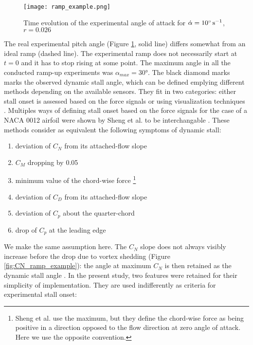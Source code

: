 \begin{figure}[h]
	\centering
	\texttt{[image: ramp\_example.png]}
	\caption{Time evolution of the experimental angle of attack for $\dot{\alpha}=10\si{\degree \per \second}$, $r=0.026$}
	\label{fig:ramp_example}
\end{figure}

The real experimental pitch angle (Figure \ref{fig:ramp_example}, solid line) differs somewhat from an ideal ramp (dashed line). The experimental ramp does not necessarily start at $t=0$ and it has to stop rising at some point. The maximum angle in all the conducted ramp-up experiments was $\alpha_{max}=\ang{30}$. The black diamond marks marks the observed dynamic stall angle, which can be defined emplying different methods depending on the available sensors.  They fit in two categories: either stall onset is assessed based on the force signals \cite{sheng_new_2006} or using visualization techniques \cite{mulleners_coherent_2010}.
Multiples ways of defining stall onset based on the force signals for the case of a NACA 0012 airfoil were shown by Sheng et al. \cite{sheng_new_2006} to be interchangable . These methods consider as equivalent the following symptoms of dynamic stall: 

\begin{enumerate}
	\item deviation of $C_N$ from its attached-flow slope
	\item $C_M$ dropping by 0.05 
	\item minimum value of the chord-wise force \footnote{Sheng et al. use the maximum, but they define the chord-wise force as being positive in a direction opposed to the flow direction at zero angle of attack. Here we use the opposite convention.}
	\item deviation of $C_D$ from its attached-flow slope
	\item deviation of $C_p$ about the quarter-chord
	\item drop of $C_p$ at the leading edge
\end{enumerate}

We make the same assumption here. The $C_N$ slope does not always visibly increase before the drop due to vortex shedding (Figure \ref{fig:CN_ramp_example}): the angle at maximum $C_N$ is then retained as the dynamic stall angle \cite{mulleners_dynamic_2013}. In the present study, two features were retained for their simplicity of implementation. They are used indifferently as criteria for experimental stall onset:

